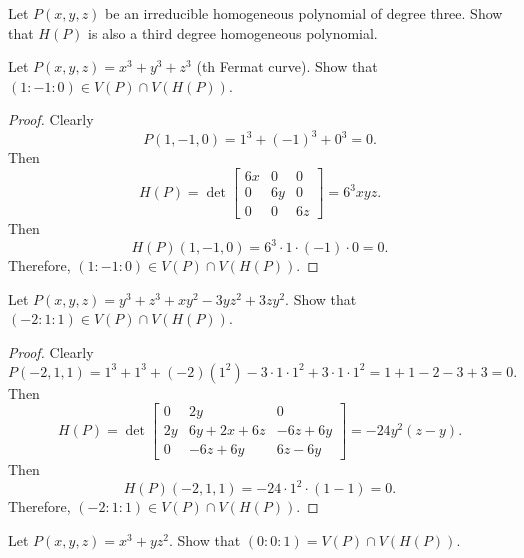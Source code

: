 \begin{tcolorbox}[title=Problem 23, breakable]
    Let $P(x, y, z)$ be an irreducible homogeneous polynomial
    of degree three. Show that $H(P)$ is also a third degree 
    homogeneous polynomial.
\end{tcolorbox}

\begin{tcolorbox}[title=Problem 24, breakable]
    Let $P(x, y, z) = x^3 + y^3 + z^3$ (th Fermat curve).
    Show that $(1 : -1 : 0) \in V(P) \cap V(H(P))$.
\end{tcolorbox}

\begin{proof}
    Clearly 
    \[
    P(1, -1, 0) = 1^3 + (-1)^3 + 0^3 = 0.
    \]
    Then 
    \[
    H(P) = \det \begin{bmatrix}
        6x & 0 & 0 \\
        0 & 6y & 0 \\
        0 & 0 & 6z
    \end{bmatrix} = 6^3 xyz.
    \]
    Then
    \[
    H(P)(1, -1, 0) = 6^3 \cdot 1 \cdot (-1) \cdot 0 = 0.
    \]
    Therefore, $(1 : -1 : 0) \in V(P) \cap V(H(P))$.
\end{proof}


\begin{tcolorbox}[title=Problem 25, breakable]
    Let $P(x, y, z) = y^3 + z^3 + xy^2 - 3 y z^2 + 3 z y^2$.
    Show that $(-2 : 1 : 1) \in V(P) \cap V(H(P))$.
\end{tcolorbox}

\begin{proof}
    Clearly 
    \[
    P(-2, 1, 1) = 1^3 + 1^3 + (-2)(1^2) - 3 \cdot 1 \cdot 1^2 + 3 \cdot 1 \cdot 1^2 = 1 + 1 - 2 - 3 + 3 = 0.
    \]
    Then 
    \[
    H(P) = \det \begin{bmatrix}
        0 & 2y & 0 \\
        2y & 6y + 2x + 6z & -6z + 6y \\
        0 & -6z + 6y & 6z - 6y
    \end{bmatrix} = -24 y^2 (z - y).
    \]
    Then
    \[
    H(P)(-2, 1, 1) = -24 \cdot 1^2 \cdot (1 - 1) = 0.
    \]
    Therefore, $(-2 : 1 : 1) \in V(P) \cap V(H(P))$.
\end{proof}

\begin{tcolorbox}[title=Problem 26, breakable]
    Let $P(x, y, z) = x^3+ y z^2$. Show that 
    $(0 : 0 : 1) = V(P) \cap V(H(P))$.
\end{tcolorbox}


